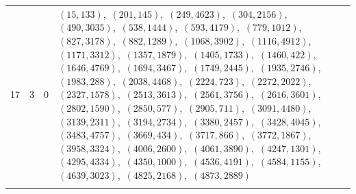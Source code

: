 \documentclass[11pt]{article}
\begin{document}
\begin{longtable}{@{}rrl>{\raggedright\arraybackslash}p{}@{}}
17 & 3 & $0$ & $(15,133)$,\allowbreak\ $(201,145)$,\allowbreak\ $(249,4623)$,\allowbreak\ $(304,2156)$,\allowbreak\ $(490,3035)$,\allowbreak\ $(538,1444)$,\allowbreak\ $(593,4179)$,\allowbreak\ $(779,1012)$,\allowbreak\ $(827,3178)$,\allowbreak\ $(882,1289)$,\allowbreak\ $(1068,3902)$,\allowbreak\ $(1116,4912)$,\allowbreak\ $(1171,3312)$,\allowbreak\ $(1357,1879)$,\allowbreak\ $(1405,1733)$,\allowbreak\ $(1460,422)$,\allowbreak\ $(1646,4769)$,\allowbreak\ $(1694,3467)$,\allowbreak\ $(1749,2445)$,\allowbreak\ $(1935,2746)$,\allowbreak\ $(1983,288)$,\allowbreak\ $(2038,4468)$,\allowbreak\ $(2224,723)$,\allowbreak\ $(2272,2022)$,\allowbreak\ $(2327,1578)$,\allowbreak\ $(2513,3613)$,\allowbreak\ $(2561,3756)$,\allowbreak\ $(2616,3601)$,\allowbreak\ $(2802,1590)$,\allowbreak\ $(2850,577)$,\allowbreak\ $(2905,711)$,\allowbreak\ $(3091,4480)$,\allowbreak\ $(3139,2311)$,\allowbreak\ $(3194,2734)$,\allowbreak\ $(3380,2457)$,\allowbreak\ $(3428,4045)$,\allowbreak\ $(3483,4757)$,\allowbreak\ $(3669,434)$,\allowbreak\ $(3717,866)$,\allowbreak\ $(3772,1867)$,\allowbreak\ $(3958,3324)$,\allowbreak\ $(4006,2600)$,\allowbreak\ $(4061,3890)$,\allowbreak\ $(4247,1301)$,\allowbreak\ $(4295,4334)$,\allowbreak\ $(4350,1000)$,\allowbreak\ $(4536,4191)$,\allowbreak\ $(4584,1155)$,\allowbreak\ $(4639,3023)$,\allowbreak\ $(4825,2168)$,\allowbreak\ $(4873,2889)$\\
\addlinespace[3pt]
\end{longtable}
\endgroup
\end{document}
